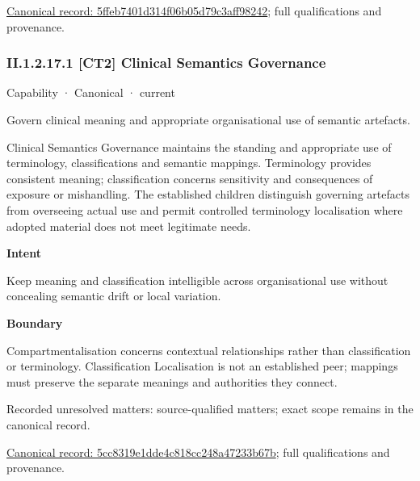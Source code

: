 {\footnotesize \href{../../../../../../../continuum/strategy/capability/5ffeb7401d314f06b05d79c3aff98242.md}{Canonical record: 5ffeb7401d314f06b05d79c3aff98242}; full qualifications and provenance.}\par
\subsubsection*{II.1.2.17.1 [CT2] Clinical Semantics Governance}
\label{navigation:II.1.2.17.1}

\label{element:5cc8319e1dde4c818cc248a47233b67b}
{\small Capability · Canonical · current}\par

Govern clinical meaning and appropriate organisational use of semantic artefacts.



Clinical Semantics Governance maintains the standing and appropriate use of terminology, classifications and semantic mappings. Terminology provides consistent meaning; classification concerns sensitivity and consequences of exposure or mishandling. The established children distinguish governing artefacts from overseeing actual use and permit controlled terminology localisation where adopted material does not meet legitimate needs.



\textbf{Intent}



Keep meaning and classification intelligible across organisational use without concealing semantic drift or local variation.



\textbf{Boundary}



Compartmentalisation concerns contextual relationships rather than classification or terminology. Classification Localisation is not an established peer; mappings must preserve the separate meanings and authorities they connect.


{\small Recorded unresolved matters: source-qualified matters; exact scope remains in the canonical record.}\par
{\footnotesize \href{../../../../../../../continuum/strategy/capability/5cc8319e1dde4c818cc248a47233b67b.md}{Canonical record: 5cc8319e1dde4c818cc248a47233b67b}; full qualifications and provenance.}\par
